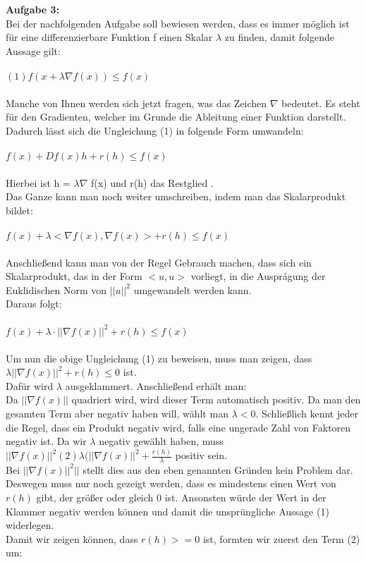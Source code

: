 \documentclass{article}
\begin{document}
\begin{multicols}{2}
\vspace{15pt}

\textbf{Aufgabe 3:}\\
Bei der nachfolgenden Aufgabe soll bewiesen werden, dass es immer möglich ist für eine differenzierbare Funktion f einen Skalar $\lambda$ zu finden, damit folgende Aussage gilt: \\ \\
$(1) f(x + \lambda \nabla f(x)) \leq f(x)$ \\ \\
Manche von Ihnen werden sich jetzt fragen, was das Zeichen $\nabla$ bedeutet. Es steht für den Gradienten, welcher im Grunde die Ableitung einer Funktion darstellt.
Dadurch lässt sich die Ungleichung (1) in folgende Form umwandeln: \\ \\
$f(x) + Df(x)h + r(h) \leq f(x)$  \\ \\
Hierbei ist h = $\lambda \nabla$ f(x) und r(h) das Restglied %
. \\
Das Ganze kann man noch weiter umschreiben, indem man das Skalarprodukt bildet: \\ \\
$f(x) + \lambda <\nabla f(x), \nabla f(x)> + r(h) \leq f(x)$ \\ \\
Anschließend kann man von der Regel Gebrauch machen, dass sich ein Skalarprodukt, das in der Form $<u,u>$ vorliegt, in die Auspr\'agung der Euklidischen Norm von $||u||^2$ umgewandelt werden kann. \\
Daraus folgt: \\ \\
$f(x) + \lambda \cdot || \nabla f(x)||^2 + r(h) \leq f(x)$ \\ \\
Um nun die obige Ungleichung (1) zu beweisen, muss man zeigen, dass \\ $\lambda ||\nabla f(x)||^2 + r(h) \leq 0$ ist.\\
Dafür wird $\lambda$ ausgeklammert. Anschließend erhält man:\\
Da $||\nabla f(x)||$ quadriert wird, wird dieser Term automatisch positiv. Da man den gesamten Term aber negativ haben will, wählt man $\lambda < 0.$ Schließlich kennt jeder die Regel, dass ein Produkt negativ wird, falls eine ungerade Zahl von Faktoren negativ ist. Da wir $\lambda$ negativ gewählt haben, muss \\ $||\nabla f(x)||^2$$(2) \lambda (||\nabla f(x)||^2 + \frac{r(h)}{\lambda}$ positiv sein.\\
Bei $||\nabla f(x)||^2||$ stellt dies aus den eben genannten Gr\"unden kein Problem dar. Deswegen muss nur noch gezeigt werden, dass es mindestens einen Wert von $r(h)$ gibt, der gr\"oßer oder gleich 0 ist. Ansonsten würde der Wert in der Klammer negativ werden k\"onnen und damit die unspr\"ungliche Aussage (1) widerlegen.\\
Damit wir zeigen k\"onnen, dass $r(h) >= 0$ ist, formten wir zuerst den Term (2) um:\\


\end{multicols}
\end{document}
